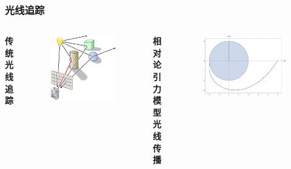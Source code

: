 \documentclass{beamer}
\begin{document}
\begin{frame}
    \frametitle{光线追踪}
    \begin{columns}[c] %

        \textbf{传统光线追踪}
        \begin{figure}
            \includegraphics[width=0.8\linewidth]{Illustration-of-basic-ray-tracing.png}
        \end{figure}


        \textbf{相对论引力模型光线传播}
        \begin{figure}
            \includegraphics[width=0.8\linewidth]{ equatorial_plane_trace_2.pdf}
        \end{figure}

    \end{columns}
\end{frame}
\end{document}
